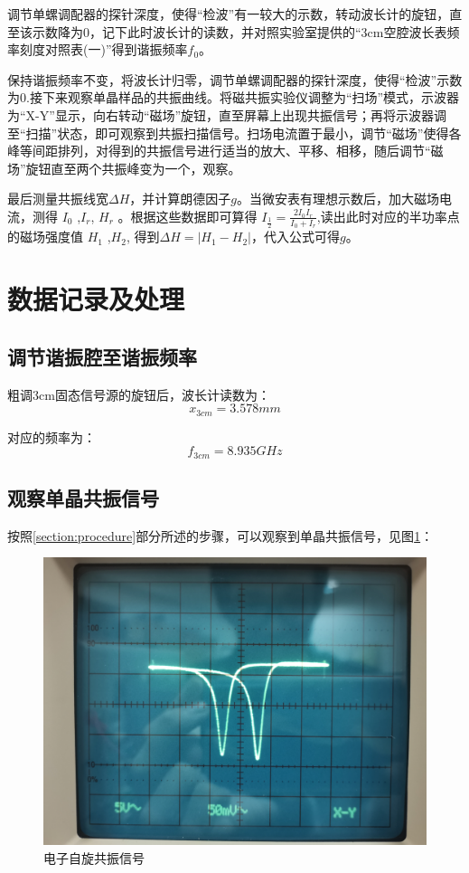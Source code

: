 \documentclass{buaaemp}
\begin{document}
	调节单螺调配器的探针深度，使得“检波”有一较大的示数，转动波长计的旋钮，直至该示数降为0，记下此时波长计的读数，并对照实验室提供的“3cm空腔波长表频率刻度对照表(一)”得到谐振频率$f_0$。
	
	保持谐振频率不变，将波长计归零，调节单螺调配器的探针深度，使得“检波”示数为0.接下来观察单晶样品的共振曲线。将磁共振实验仪调整为“扫场”模式，示波器为“X-Y”显示，向右转动“磁场”旋钮，直至屏幕上出现共振信号；再将示波器调至“扫描”状态，即可观察到共振扫描信号。扫场电流置于最小，调节“磁场”使得各峰等间距排列，对得到的共振信号进行适当的放大、平移、相移，随后调节“磁场”旋钮直至两个共振峰变为一个，观察。
	
	最后测量共振线宽$\Delta H$，并计算朗德因子$g$。当微安表有理想示数后，加大磁场电流，测得 $I_0$ ,$I_r$, $H_r$ 。根据这些数据即可算得 $I_{\frac{1}{2}}=\frac{2I_0 I_r}{I_0 + I_r}$,读出此时对应的半功率点的磁场强度值 $H_1$ ,$H_2$, 得到$\Delta H=|H_1 -H_2|$，代入公式可得$g$。
	
	\section{数据记录及处理}
	\subsection{调节谐振腔至谐振频率}
	粗调3cm固态信号源的旋钮后，波长计读数为：$$x_{3cm}=3.578mm$$
	
	对应的频率为：$$f_{3cm}=8.935GHz$$
	\subsection{观察单晶共振信号}
	按照\ref{section:procedure}部分所述的步骤，可以观察到单晶共振信号，见图\ref{figure:one}：
	\begin{figure}[htbp]
		\centering
		\includegraphics[width=\linewidth]{image/one.jpg}
		\caption{电子自旋共振信号}
		\label{figure:one}
	\end{figure}
\end{document}
